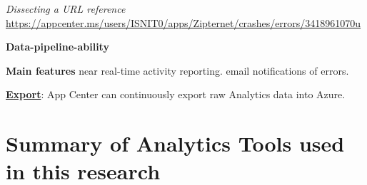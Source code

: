 \emph{Dissecting a URL reference}
\url{https://appcenter.ms/users/ISNIT0/apps/Zipternet/crashes/errors/3418961070u}


\textbf{Data-pipeline-ability}


\textbf{Main features}
near real-time activity reporting.
email notifications of errors.

\href{https://docs.microsoft.com/en-us/appcenter/analytics/export}{\textbf{Export}}: App Center can continuously export raw Analytics data into Azure.


\section{Summary of Analytics Tools used in this research}
